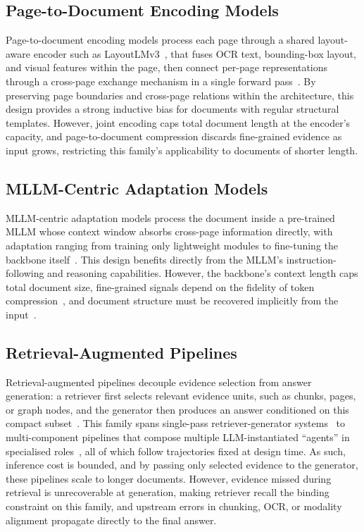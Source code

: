 \documentclass[11pt]{article}
\begin{document}
\subsection{Page-to-Document Encoding Models}
\label{sec:arch-p2d}
Page-to-document encoding models process each page through a shared layout-aware encoder such as LayoutLMv3~\cite{huang2022layoutlmv3}, that fuses OCR text, bounding-box layout, and visual features within the page, then connect per-page representations through a cross-page exchange mechanism in a single forward pass~\cite{dong2024multi, borchmann2025arctic}. By preserving page boundaries and cross-page relations within the architecture, this design provides a strong inductive bias for documents with regular structural templates. However, joint encoding caps total document length at the encoder's capacity, and page-to-document compression discards fine-grained evidence as input grows, restricting this family's applicability to documents of shorter length.

\subsection{MLLM-Centric Adaptation Models}
\label{sec:arch-mllm}
MLLM-centric adaptation models process the document inside a pre-trained MLLM whose context window absorbs cross-page information directly, with adaptation ranging from training only lightweight modules to fine-tuning the backbone itself~\cite{tanaka2024instructdoc, hu2025mplug2, duan2025docopilot, xiong2026docr1}. This design benefits directly from the MLLM's instruction-following and reasoning capabilities. However, the backbone's context length caps total document size, fine-grained signals depend on the fidelity of token compression~\cite{jia2024leopard}, and document structure must be recovered implicitly from the input~\cite{hannan2025docslm}.

\subsection{Retrieval-Augmented Pipelines}
\label{sec:arch-ra}
Retrieval-augmented pipelines decouple evidence selection from answer generation: a retriever first selects relevant evidence units, such as chunks, pages, or graph nodes, and the generator then produces an answer conditioned on this compact subset~\cite{cho2024m3docrag, tanaka2025vdocrag}.  This family spans single-pass retriever-generator systems~\cite{cho2024m3docrag} to multi-component pipelines that compose multiple LLM-instantiated ``agents'' in specialised roles~\cite{han2025mdocagent, suri2025visdom}, all of which follow trajectories fixed at design time. As such, inference cost is bounded, and by passing only selected evidence to the generator, these pipelines scale to longer documents. However, evidence missed during retrieval is unrecoverable at generation, making retriever recall the binding constraint on this family, and upstream errors in chunking, OCR, or modality alignment propagate directly to the final answer.
\end{document}
